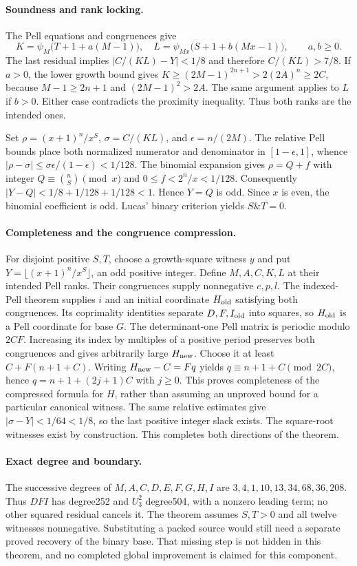\paragraph{Soundness and rank locking.}
The Pell equations and congruences give
\[
 K=\psi_M\bigl(T+1+a(M-1)\bigr),\quad
 L=\psi_{Mx}\bigl(S+1+b(Mx-1)\bigr),\qquad a,b\ge0.
\]
The last residual implies $|C/(KL)-Y|<1/8$ and therefore
$C/(KL)>7/8$. If $a>0$, the lower growth bound gives
$K\ge(2M-1)^{2n+1}>2(2A)^n\ge2C$, because
$M-1\ge2n+1$ and $(2M-1)^2>2A$. The same argument applies to
$L$ if $b>0$. Either case contradicts the proximity inequality.
Thus both ranks are the intended ones.

Set $\rho=(x+1)^n/x^S$, $\sigma=C/(KL)$, and
$\epsilon=n/(2M)$. The relative Pell bounds place both normalized
numerator and denominator in $[1-\epsilon,1]$, whence
$|\rho-\sigma|\le\sigma\epsilon/(1-\epsilon)<1/128$.
The binomial expansion gives $\rho=Q+f$ with integer
$Q\equiv\binom nS\pmod x$ and $0\le f<2^n/x<1/128$.
Consequently $|Y-Q|<1/8+1/128+1/128<1$. Hence $Y=Q$ is odd.
Since $x$ is even, the binomial coefficient is odd. Lucas' binary
criterion yields $S\mathbin{\&}T=0$.

\paragraph{Completeness and the congruence compression.}
For disjoint positive $S,T$, choose a growth-square witness $y$ and
put $Y=\lfloor(x+1)^n/x^S\rfloor$, an odd positive integer. Define
$M,A,C,K,L$ at their intended Pell ranks. Their congruences supply
nonnegative $c,p,l$. The indexed-Pell theorem supplies $i$ and an
initial coordinate $H_{\rm old}$ satisfying both congruences.
Its coprimality identities separate $D,F,I_{\rm old}$ into squares,
so $H_{\rm old}$ is a Pell coordinate for base $G$.
The determinant-one Pell matrix is periodic modulo $2CF$.
Increasing its index by multiples of a positive period preserves both
congruences and gives arbitrarily large $H_{\rm new}$. Choose it at
least $C+F(n+1+C)$. Writing $H_{\rm new}-C=Fq$ yields
$q\equiv n+1+C\pmod{2C}$, hence
$q=n+1+(2j+1)C$ with $j\ge0$. This proves completeness of the
compressed formula for $H$, rather than assuming an unproved bound
for a particular canonical witness.
The same relative estimates give $|\sigma-Y|<1/64<1/8$, so the
last positive integer slack exists. The square-root witnesses exist
by construction. This completes both directions of the theorem.

\paragraph{Exact degree and boundary.}
The successive degrees of $M,A,C,D,E,F,G,H,I$ are
$3,4,1,10,13,34,68,36,208$. Thus $DFI$ has degree252 and
$U_3^2$ degree504, with a nonzero leading term; no other squared
residual cancels it. The theorem assumes $S,T>0$ and all twelve
witnesses nonnegative. Substituting a packed source would still need
a separate proved recovery of the binary base. That missing step is
not hidden in this theorem, and no completed global improvement is
claimed for this component.
